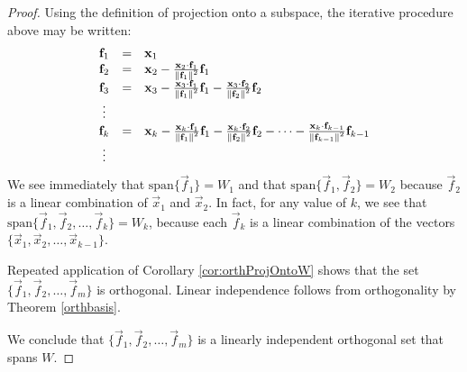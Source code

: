 \documentclass{ximera}
\begin{document}
\begin{theorem}
\begin{proof}
Using the definition of projection onto a subspace, the iterative procedure above may be written:
\begin{equation}\label{eqn:GSproof}
\begin{array}{ccl}
\mathbf{f}_{1} &=& \mathbf{x}_{1} \\
\mathbf{f}_{2} &=& \mathbf{x}_{2} - \frac{\mathbf{x}_{2} \cdot \mathbf{f}_{1}}{\left\lVert\mathbf{f}_{1}\right\rVert^2}\mathbf{f}_{1} \\
\mathbf{f}_{3} &=& \mathbf{x}_{3} - \frac{\mathbf{x}_{3} \cdot \mathbf{f}_{1}}{\left\lVert\mathbf{f}_{1}\right\rVert^2}\mathbf{f}_{1} - \frac{\mathbf{x}_{3} \cdot \mathbf{f}_{2}}{\left\lVert\mathbf{f}_{2}\right\rVert^2}\mathbf{f}_{2} \\
\vdots &&\\
\mathbf{f}_{k} &=& \mathbf{x}_{k} - \frac{\mathbf{x}_{k} \cdot \mathbf{f}_{1}}{\left\lVert\mathbf{f}_{1}\right\rVert^2}\mathbf{f}_{1} - \frac{\mathbf{x}_{k} \cdot \mathbf{f}_{2}}{\left\lVert\mathbf{f}_{2}\right\rVert^2}\mathbf{f}_{2} - \dots -\frac{\mathbf{x}_{k} \cdot \mathbf{f}_{k-1}}{\left\lVert\mathbf{f}_{k-1}\right\rVert^2}\mathbf{f}_{k-1} \\
\vdots &&
\end{array}
\end{equation}
We see immediately that $\mbox{span}\{\vec{f}_{1}\}=W_1$ and that $\mbox{span}\{\vec{f}_{1},\vec{f}_{2}\}=W_2$ because $\vec{f}_{2}$ is a linear combination of $\vec{x}_{1}$ and $\vec{x}_{2}$.  In fact, for any value of $k$, we see that $\mbox{span}\{\vec{f}_{1},\vec{f}_{2},\ldots,\vec{f}_{k}\}=W_k$, because each $\vec{f}_{k}$ is a linear combination of the vectors $\{\vec{x}_{1},\vec{x}_{2},\ldots,\vec{x}_{k-1}\}$.

Repeated application of Corollary \ref{cor:orthProjOntoW} shows that the set
 $\{\vec{f}_{1},\vec{f}_{2},\ldots,\vec{f}_{m}\}$ is orthogonal.  Linear independence follows from orthogonality by Theorem \ref{orthbasis}.  

We conclude that $\{\vec{f}_{1},\vec{f}_{2},\ldots,\vec{f}_{m}\}$ is a linearly independent orthogonal set that spans $W$.
\end{proof}
\end{theorem}

\end{document}

